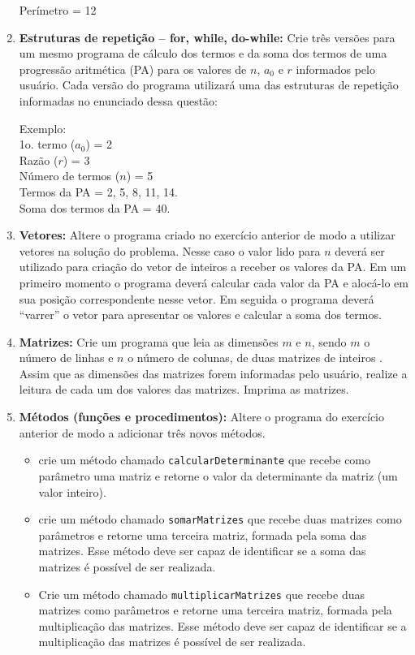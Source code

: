 \documentclass[a4paper, 12pt]{letter}
\begin{document}
\begin{enumerate}
    Perímetro = 12

  \item \textbf{Estruturas de repetição -- for, while, do-while:} Crie três
    versões para um mesmo programa de cálculo dos termos e da soma dos termos de
    uma progressão aritmética (PA) para os valores de $n$, $a_0$ e $r$
    informados pelo usuário. Cada versão do programa utilizará uma das
    estruturas de repetição informadas no enunciado dessa questão:

    Exemplo: \\
    1o. termo ($a_0$) = 2 \\
    Razão ($r$) = 3 \\
    Número de termos ($n$) = 5 \\

    Termos da PA = 2, 5, 8, 11, 14. \\
    Soma dos termos da PA = 40.

  \item \textbf{Vetores:} Altere o programa criado no exercício anterior de modo
    a utilizar vetores na solução do problema. Nesse caso o valor lido para $n$
    deverá ser utilizado para criação do vetor de inteiros a receber os valores
    da PA. Em um primeiro momento o programa deverá calcular cada valor da PA e
    alocá-lo em sua posição correspondente nesse vetor. Em seguida o programa
    deverá ``varrer'' o vetor para apresentar os valores e calcular a soma dos
    termos. 
    

  \item \textbf{Matrizes:} Crie um programa que leia as dimensões $m$ e $n$,
    sendo $m$ o número de linhas e $n$ o número de colunas, de duas matrizes de
    inteiros . Assim que as dimensões das matrizes forem informadas pelo
    usuário, realize a leitura de cada um dos valores das matrizes. Imprima as
    matrizes. 

  \item \textbf{Métodos (funções e procedimentos):} Altere o programa do
    exercício anterior de modo a adicionar três novos métodos. 
    \begin{itemize}
      \item crie um método chamado \texttt{calcularDeterminante} que recebe como
	parâmetro uma matriz e retorne o valor da determinante da matriz (um
	valor inteiro).
      \item crie um método chamado \texttt{somarMatrizes} que recebe duas
	matrizes como parâmetros e retorne uma terceira matriz, formada pela
	soma das matrizes. Esse método deve ser capaz de identificar se a soma
	das matrizes é possível de ser realizada.
      \item Crie um método chamado \texttt{multiplicarMatrizes} que recebe duas
	matrizes como parâmetros e retorne uma terceira matriz, formada pela
	multiplicação das matrizes. Esse método deve ser capaz de identificar se
	a multiplicação das matrizes é possível de ser realizada. 
    \end{itemize}
\end{enumerate}
\end{document}
